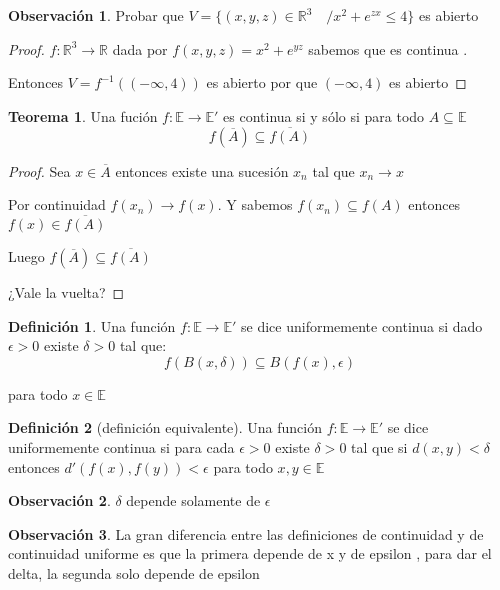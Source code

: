 \documentclass[12pt]{article}
\newcommand{\R}{\mathbb{R}}
\newcommand{\E}{\mathbb{E}}
\newcommand{\ra}{\rightarrow}
\newcommand{\ol}{\overline}
\theoremstyle{definition}
\newtheorem{definition}{Definición}[section]
\newtheorem*{remark}{Observación}
\newtheorem{theorem}{Teorema}
\begin{document}
\begin{remark}
  Probar que $V = \{(x,y,z) \in \R^3 \quad / x^2 + e^{zx} \leq 4\}$ es abierto
  \begin{proof}
    $f: \R^3 \ra \R$ dada por $f(x,y,z) = x^2 + e^{yz}$ sabemos que es continua .

    Entonces $V = f^{-1}((-\infty,4))$ es abierto por que $(-\infty , 4)$ es abierto
  \end{proof}
\end{remark}
\begin{theorem}
  Una fución $f: \E \ra \E '$ es continua si y sólo si para todo $A \subseteq \E$ $$ f(\ol A) \subseteq \ol{f(A)}$$
\begin{proof}
  Sea $x \in \ol A$ entonces existe una sucesión $x_n$ tal que $x_n \ra x$ 

  Por continuidad $f(x_n) \ra f(x)$. Y sabemos $f(x_n) \subseteq f(A)$ entonces $f(x) \in \ol{f(A)}$ 

  Luego $f(\ol A) \subseteq \ol{f(A)}$

  ¿Vale la vuelta?
\end{proof}
\end{theorem}
\begin{definition}
  Una función $f:\E \ra \E '$ se dice uniformemente continua si dado $\epsilon > 0$ existe $\delta > 0$ tal que:
  $$ f(B(x,\delta)) \subseteq B(f(x),\epsilon)$$ 

  para todo $x \in \E$
\end{definition}
\begin{definition}[definición equivalente]
  Una función $f: \E \ra \E '$ se dice uniformemente continua si para cada $\epsilon > 0$ existe $\delta > 0$ tal que si $d(x,y) < \delta$ entonces $d'(f(x),f(y)) < \epsilon$ para todo $x,y \in \E $ 
  \begin{remark}
    $\delta$ depende solamente de $\epsilon$
  \end{remark}
\end{definition}
\begin{remark}
  La gran diferencia entre las definiciones de continuidad y de continuidad uniforme es que la primera depende de x y de epsilon , para dar el delta, la segunda solo depende de epsilon
\end{remark}
\end{document}
